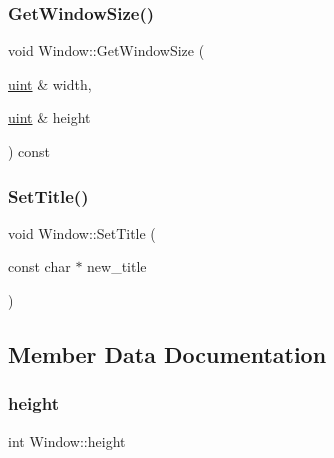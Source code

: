 \mbox{\label{class_window_ad113a4ecdb4b2b366f4cb96d4fb2c9db}} 
\subsubsection{\texorpdfstring{GetWindowSize()}{GetWindowSize()}}
{\footnotesize\ttfamily void Window\+::\+Get\+Window\+Size (\begin{DoxyParamCaption}\item[{\mbox{\hyperlink{_defs_8h_a91ad9478d81a7aaf2593e8d9c3d06a14}{uint}} \&}]{width,  }\item[{\mbox{\hyperlink{_defs_8h_a91ad9478d81a7aaf2593e8d9c3d06a14}{uint}} \&}]{height }\end{DoxyParamCaption}) const}

\mbox{\label{class_window_acc92146b568ce9b148db0d70653ebd5b}} 
\subsubsection{\texorpdfstring{SetTitle()}{SetTitle()}}
{\footnotesize\ttfamily void Window\+::\+Set\+Title (\begin{DoxyParamCaption}\item[{const char $\ast$}]{new\+\_\+title }\end{DoxyParamCaption})}



\subsection{Member Data Documentation}
\mbox{\label{class_window_af0ac1732ca6b79a6f6b78aa344140514}} 
\subsubsection{\texorpdfstring{height}{height}}
{\footnotesize\ttfamily int Window\+::height}

\mbox{\label{class_window_a4fef6f02971f830ca788fec46392f87c}} 
